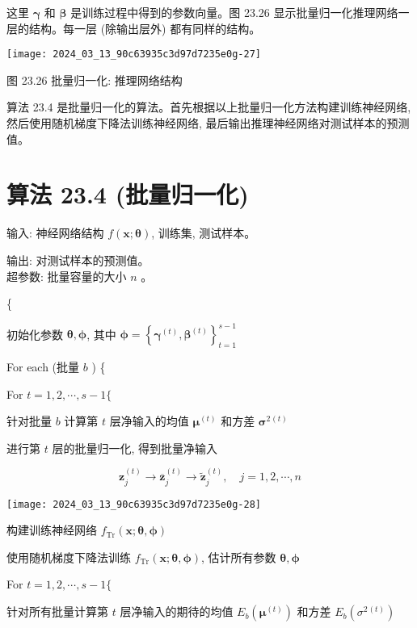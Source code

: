 \documentclass[10pt]{article}
\begin{document}
\begin{CJK*}{UTF8}{bsmi}
这里 $\boldsymbol{\gamma}$ 和 $\boldsymbol{\beta}$ 是训练过程中得到的参数向量。图 23.26 显示批量归一化推理网络一层的结构。每一层 (除输出层外) 都有同样的结构。

\begin{center}
\texttt{[image: 2024\_03\_13\_90c63935c3d97d7235e0g-27]}
\end{center}

图 23.26 批量归一化: 推理网络结构

算法 23.4 是批量归一化的算法。首先根据以上批量归一化方法构建训练神经网络, 然后使用随机梯度下降法训练神经网络, 最后输出推理神经网络对测试样本的预测值。

\section*{算法 23.4 (批量归一化)}
输入: 神经网络结构 $f(\boldsymbol{x} ; \boldsymbol{\theta})$, 训练集, 测试样本。

输出: 对测试样本的预测值。\\
超参数: 批量容量的大小 $n$ 。

\{

初始化参数 $\boldsymbol{\theta}, \boldsymbol{\phi}$, 其中 $\boldsymbol{\phi}=\left\{\boldsymbol{\gamma}^{(t)}, \boldsymbol{\beta}^{(t)}\right\}_{t=1}^{s-1}$

For each (批量 $b$ ) \{

For $t=1,2, \cdots, s-1\{$

针对批量 $b$ 计算第 $t$ 层净输入的均值 $\boldsymbol{\mu}^{(t)}$ 和方差 $\boldsymbol{\sigma}^{2}{ }^{(t)}$

进行第 $t$ 层的批量归一化, 得到批量净输入

$$
\boldsymbol{z}_{j}^{(t)} \rightarrow \overline{\boldsymbol{z}}_{j}^{(t)} \rightarrow \tilde{\boldsymbol{z}}_{j}^{(t)}, \quad j=1,2, \cdots, n
$$

\begin{center}
\texttt{[image: 2024\_03\_13\_90c63935c3d97d7235e0g-28]}
\end{center}

构建训练神经网络 $f_{\operatorname{Tr}}(\boldsymbol{x} ; \boldsymbol{\theta}, \boldsymbol{\phi})$

使用随机梯度下降法训练 $f_{\operatorname{Tr}}(\boldsymbol{x} ; \boldsymbol{\theta}, \boldsymbol{\phi})$, 估计所有参数 $\boldsymbol{\theta}, \boldsymbol{\phi}$

For $t=1,2, \cdots, s-1\{$

针对所有批量计算第 $t$ 层净输入的期待的均值 $E_{b}\left(\boldsymbol{\mu}^{(t)}\right)$ 和方差 $E_{b}\left(\sigma^{2}{ }^{(t)}\right)$


\end{CJK*}
\end{document}

